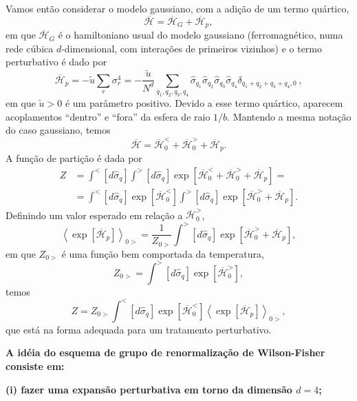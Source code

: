 \documentclass[12pt,a4paper]{article}
\newcommand{\Hb}{\overline{\mathcal{H}}}
\newcommand{\sh}{\widehat{\sigma}}
\begin{document}
Vamos então considerar o modelo gaussiano, com a adição de um termo
quártico,
\begin{equation}
\Hb=\Hb_G+\Hb_p,
\end{equation}
em que $\Hb_G$ é o hamiltoniano usual do modelo gaussiano (ferromagnético,
numa rede cúbica $d$-dimensional, com interações de primeiros vizinhos) e o
termo perturbativo é dado por
\begin{equation}
\Hb_p=-\widetilde u\sum_r\sigma_r^4=-\frac{\widetilde u}{N^d}\sum_{q_1,q_2,q_3,q_4}\sh_{q_1}\sh_{q_2}\sh_{q_3}\sh_{q_4}\delta_{q_1+q_2+q_3+q_4,0}\,,
\end{equation}
em que $\widetilde u>0$ é um parâmetro positivo. Devido a esse termo quártico,
aparecem acoplamentos ``dentro'' e ``fora'' da esfera de raio $1/b$. Mantendo a
mesma notação do caso gaussiano, temos
\begin{equation}
\Hb=\Hb_0^{<}+\Hb_0^{>}+\Hb_p.
\end{equation}
A função de partição é dada por
\begin{equation}
\begin{split}
Z&=\int^{<}\left[d\sh_q\right]\int^{>}\left[d\sh_q\right]\exp\left[\Hb_0^{<}+\Hb_0^{>}+\Hb_p\right]=\\
&=\int^{<}\left[d\sh_q\right]\exp\left[\Hb_0^{<}\right]\int^{>}\left[d\sh_q\right]\exp\left[\Hb_0^{>}+\Hb_p\right].
\end{split}
\end{equation}
Definindo um valor esperado em relação a $\Hb_0^{>}$,
\begin{equation}
\left\langle\exp\left[\Hb_p\right]\right\rangle_{0>}=\frac{1}{Z_{0>}}\int^{>}\left[d\sh_q\right]\exp\left[\Hb_0^{>}+\Hb_p\right],
\end{equation}
em que $Z_{0>}$ é uma função bem comportada da temperatura,
\begin{equation}
Z_{0>}=\int^{>}\left[d\sh_q\right]\exp\left[\Hb_0^{>}\right],
\end{equation}
temos
\begin{equation}
Z=Z_{0>}\int^{<}\left[d\sh_q\right]\exp\left[\Hb_0^{<}\right]\left\langle\exp\left[\Hb_p\right]\right\rangle_{0>},
\end{equation}
que está na forma adequada para um tratamento perturbativo.

\textbf{A idéia do esquema de grupo de renormalização de Wilson-Fisher consiste em:}

\textbf{(i) fazer uma expansão perturbativa em torno da dimensão $d=4$;}
\end{document}
